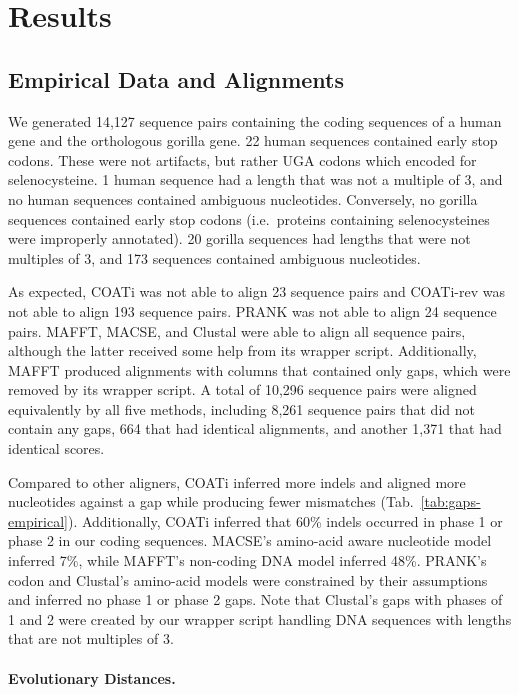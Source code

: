 \documentclass[12pt,letterpaper]{article}
\begin{document}
\section*{Results}

\subsection*{Empirical Data and Alignments}

We generated 14,127 sequence pairs containing the coding sequences of a human gene and the orthologous gorilla gene. 22 human sequences contained early stop codons. These were not artifacts, but rather UGA codons which encoded for selenocysteine. 1 human sequence had a length that was not a multiple of 3, and no human sequences contained ambiguous nucleotides. Conversely, no gorilla sequences contained early stop codons (i.e.\ proteins containing selenocysteines were improperly annotated). 20 gorilla sequences had lengths that were not multiples of 3, and 173 sequences contained ambiguous nucleotides.

As expected, COATi was not able to align 23 sequence pairs and COATi-rev was not able to align 193 sequence pairs. PRANK was not able to align 24 sequence pairs. MAFFT, MACSE, and Clustal\textOmega{} were able to align all sequence pairs, although the latter received some help from its wrapper script. Additionally, MAFFT produced alignments with columns that contained only gaps, which were removed by its wrapper script.
A total of 10,296 sequence pairs were aligned equivalently by all five methods, including 8,261 sequence pairs that did not contain any gaps, 664 that had identical alignments, and another 1,371 that had identical scores.

Compared to other aligners, COATi inferred more indels and aligned more nucleotides against a gap while producing fewer mismatches (Tab.~\ref{tab:gaps-empirical}). Additionally, COATi inferred that 60\% indels occurred in phase 1 or phase 2 in our coding sequences. MACSE's amino-acid aware nucleotide model inferred 7\%, while MAFFT's non-coding DNA model inferred 48\%. PRANK's codon and Clustal\textOmega{}'s amino-acid models were constrained by their assumptions and inferred no phase 1 or phase 2 gaps. Note that Clustal\textOmega{}'s gaps with phases of 1 and 2 were created by our wrapper script handling DNA sequences with lengths that are not multiples of 3.  

\paragraph{Evolutionary Distances.}
\end{document}
